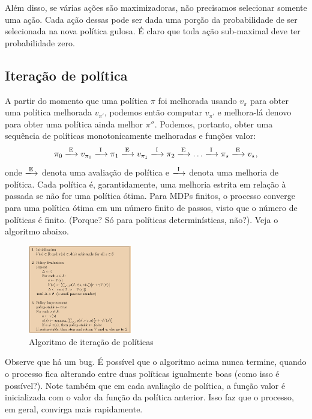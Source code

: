 \documentclass{article}
\begin{document}
Além disso, se várias ações são maximizadoras, não precisamos selecionar somente uma ação. Cada ação dessas pode ser dada uma porção da probabilidade de ser selecionada na nova política gulosa. É claro que toda ação sub-maximal deve ter probabilidade zero.

\newpage

\subsection{Iteração de política}
A partir do momento que uma política $\pi$ foi melhorada usando $v_{\pi}$ para obter uma política melhorada $v_{\pi'}$, podemos então computar $v_{\pi'}$ e melhora-lá denovo para obter uma política ainda melhor $\pi''$. Podemos, portanto, obter uma sequência de políticas monotonicamente melhoradas e funções valor:
\[
  \pi_0 \xlongrightarrow[]{\text{E}} v_{\pi_0} \xlongrightarrow[]{\text{I}} \pi_1 \xlongrightarrow[]{\text{E}} v_{\pi_1} \xlongrightarrow[]{\text{I}} \pi_2 \xlongrightarrow[]{\text{E}} \ldots \xlongrightarrow[]{\text{I}} \pi_{\star} \xlongrightarrow[]{\text{E}} v_{\star} 
,\] 
onde $\xlongrightarrow[]{\text{E}}$ denota uma avaliação de política e $\xlongrightarrow[]{\text{I}}$ denota uma melhoria de política. Cada política é, garantidamente, uma melhoria estrita em relação à passada se não for uma política ótima. Para MDPs finitos, o processo converge para uma política ótima em um número finito de passos, visto que o número de políticas é finito. (Porque? Só para políticas determinísticas, não?). Veja o algoritmo abaixo.

\begin{figure}[htpb]
  \centering
  \includegraphics[width=0.4\textwidth]{fig4.3.png}
  \caption{Algoritmo de iteração de políticas}
  \label{fig:fig4-3-png}
\end{figure}


Observe que há um bug. É possível que o algoritmo acima nunca termine, quando o processo fica alterando entre duas políticas igualmente boas (como isso é possível?). Note também que em cada avaliação de política, a função valor é inicializada com o valor da função da política anterior. Isso faz que o processo, em geral, convirga mais rapidamente.
\end{document}
